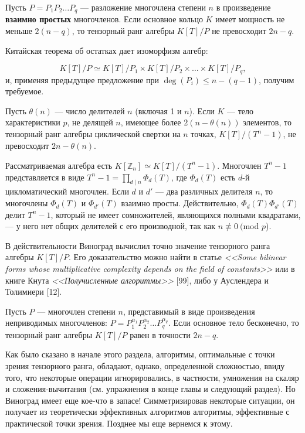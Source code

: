 \documentclass{mai_book}
\renewcommand{\le}{\leqslant}
\begin{document}
\begin{sled}
  Пусть $P = P_1P_2 \ldots P_q$ --- разложение многочлена степени $n$ в произведение \textbf{\textup{взаимно простых}} многочленов. Если основное кольцо $K$ имеет мощность не меньше $2(n - q)$, то тензорный ранг алгебры $K[T]/P$ не превосходит $2n - q$.
  \end{sled}
\begin{myproof}
Китайская теорема об остатках дает изоморфизм алгебр:\par
$$K[T]/P \simeq K[T]/P_1 \times K[T]/P_2 \times \ldots \times K[T]/P_q,$$\noindent
и, применяя предыдущее предложение при $ \deg (P_i) \le n - (q - 1)$, получим требуемое.
\end{myproof}
\begin{sled}
  Пусть $\theta (n)$ --- число делителей $n$ (включая 1 и $n$). Если $K$ --- тело характеристики $p$, не делящей $n$, имеющее более $2(n - \theta (n))$ элементов, то тензорный ранг алгебры циклической свертки на $n$ точках, $K[T]/(T^n - 1)$, не превосходит $2n - \theta (n)$.
    \end{sled}
\begin{myproof}
  Рассматриваемая алгебра есть $K[\mathbb{Z}_n] \simeq K[T]/(T^n - 1)$. Многочлен $T^n - 1$ представляется в виде $T^n - 1 = \prod_{d \mid n} \Phi_d(T)$, где $\Phi_d(T)$ есть $d$-й цикломатический многочлен. Если $d$ и $d'$ --- два различных делителя $n$, то многочлены $\Phi_d(T)$ и $\Phi_{d'}(T)$ взаимно просты. Действительно, $\Phi_d(T)\Phi_{d'}(T)$ делит $T^n - 1$, который не имеет сомножителей, являющихся полными квадратами, --- у него нет общих делителей с его производной, так как $n \not\equiv 0\ ($mod $p$).
  \end{myproof}
В действительности Виноград вычислил точно значение тензорного ранга алгебры $K[T]/P$. Его доказательство можно найти в статье \textit{<<Some bilinear forms whose multiplicative complexity depends on the field of constants>>} или в книге Кнута \textit{<<Получисленные алгоритмы>>} [99], либо у Ауслендера и Толимиери [12].\par
\begin{thm}[Виноград]
  Пусть $P$ --- многочлен степени $n$, представимый в виде произведения неприводимых многочленов: $P = P^{\alpha_1}_1P^{\alpha_2}_2 \ldots P^{\alpha_q}_q$. Если основное тело бесконечно, то тензорный ранг алгебры $K[T]/P$ равен в точности $2n - q$.
  \end{thm}
Как было сказано в начале этого раздела, алгоритмы, оптимальные с точки зрения тензорного ранга, обладают, однако, определенной сложностью, ввиду того, что некоторые операции игнорировались, в частности, умножения на скаляр и сложения-вычитания (см. упражнения в конце главы и следующий раздел). Но Виноград имеет еще кое-что в запасе! Симметризировав некоторые ситуации, он получает из теоретически эффективных алгоритмов алгоритмы, эффективные с практической точки зрения. Позднее мы еще вернемся к этому.
\end{document}

